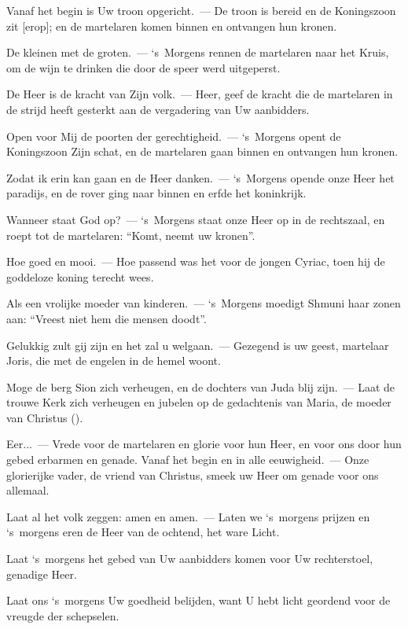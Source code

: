 \documentclass[12pt,twoside,a5paper]{article}
\begin{document}
\begin{halfparskip}
  Vanaf het begin is Uw troon opgericht.~--- De troon is bereid en de Koningszoon zit [erop]; en de martelaren komen binnen en ontvangen hun kronen.

  De kleinen met de groten.~--- `s~Morgens rennen de martelaren naar het Kruis, om de wijn te drinken die door de speer werd uitgeperst.

  De Heer is de kracht van Zijn volk.~--- Heer, geef de kracht die de martelaren in de strijd heeft gesterkt aan de vergadering van Uw aanbidders.

  Open voor Mij de poorten der gerechtigheid.~--- `s~Morgens opent de Koningszoon Zijn schat, en de martelaren gaan binnen en ontvangen hun kronen.

  Zodat ik erin kan gaan en de Heer danken.~--- `s~Morgens opende onze Heer het paradijs, en de rover ging naar binnen en erfde het koninkrijk.

  Wanneer staat God op?~--- `s~Morgens staat onze Heer op in de rechtszaal, en roept tot de martelaren: ``Komt, neemt uw kronen''.

  Hoe goed en mooi.~--- Hoe passend was het voor de jongen Cyriac, toen hij de goddeloze koning terecht wees.

  Als een vrolijke moeder van kinderen.~--- `s~Morgens moedigt Shmuni haar zonen aan: ``Vreest niet hem die mensen doodt''.

  Gelukkig zult gij zijn en het zal u welgaan.~--- Gezegend is uw geest, martelaar Joris, die met de engelen in de hemel woont.

  Moge de berg Sion zich verheugen, en de dochters van Juda blij zijn.~--- Laat de trouwe Kerk zich verheugen en jubelen op de gedachtenis van Maria, de moeder van Christus ().

  Eer...~--- Vrede voor de martelaren en glorie voor hun Heer, en voor ons door hun gebed erbarmen en genade. Vanaf het begin en in alle eeuwigheid.~--- Onze glorierijke vader, de vriend van Christus, smeek uw Heer om genade voor ons allemaal.

  Laat al het volk zeggen: amen en amen.~--- Laten we `s~morgens prijzen en `s~morgens eren de Heer van de ochtend, het ware Licht.

  Laat `s~morgens het gebed van Uw aanbidders komen voor Uw rechterstoel, genadige Heer.

  Laat ons `s~morgens Uw goedheid belijden, want U hebt licht geordend voor de vreugde der schepselen.
\end{halfparskip}
\end{document}
